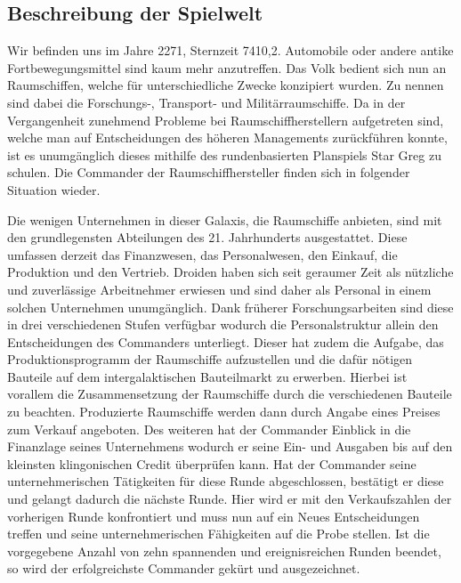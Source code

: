 \subsection{Beschreibung der Spielwelt}
\label{sec:spielwelt-szenario-spielwelt}

Wir befinden uns im Jahre 2271, Sternzeit 7410,2. Automobile oder andere antike Fortbewegungsmittel sind kaum mehr anzutreffen. Das Volk bedient sich nun an Raumschiffen, welche für unterschiedliche Zwecke konzipiert wurden. Zu nennen sind dabei die Forschungs-, Transport- und Militärraumschiffe. Da in der Vergangenheit zunehmend Probleme bei Raumschiffherstellern aufgetreten sind, welche man auf Entscheidungen des höheren Managements zurückführen konnte, ist es unumgänglich dieses mithilfe des rundenbasierten Planspiels Star Greg zu schulen. Die Commander der Raumschiffhersteller finden sich in folgender Situation wieder.

Die wenigen Unternehmen in dieser Galaxis, die Raumschiffe anbieten, sind mit den grundlegensten Abteilungen des 21. Jahrhunderts ausgestattet. Diese umfassen derzeit das Finanzwesen, das Personalwesen, den Einkauf, die Produktion und den Vertrieb. Droiden haben sich seit geraumer Zeit als nützliche und zuverlässige Arbeitnehmer erwiesen und sind daher als Personal in einem solchen Unternehmen unumgänglich. Dank früherer Forschungsarbeiten sind diese in drei verschiedenen Stufen verfügbar wodurch die Personalstruktur allein den Entscheidungen des Commanders unterliegt. Dieser hat zudem die Aufgabe, das Produktionsprogramm der Raumschiffe aufzustellen und die dafür nötigen Bauteile auf dem intergalaktischen Bauteilmarkt zu erwerben. Hierbei ist vorallem die Zusammensetzung der Raumschiffe durch die verschiedenen Bauteile zu beachten. Produzierte Raumschiffe werden dann durch Angabe eines Preises zum Verkauf angeboten. Des weiteren hat der Commander Einblick in die Finanzlage seines Unternehmens wodurch er seine Ein- und Ausgaben bis auf den kleinsten klingonischen Credit überprüfen kann. Hat der Commander seine unternehmerischen Tätigkeiten für diese Runde abgeschlossen, bestätigt er diese und gelangt dadurch die nächste Runde. Hier wird er mit den Verkaufszahlen der vorherigen Runde konfrontiert und muss nun auf ein Neues Entscheidungen treffen und seine unternehmerischen Fähigkeiten auf die Probe stellen. Ist die vorgegebene Anzahl von zehn spannenden und ereignisreichen Runden beendet, so wird der erfolgreichste Commander gekürt und ausgezeichnet.

\autorende{}